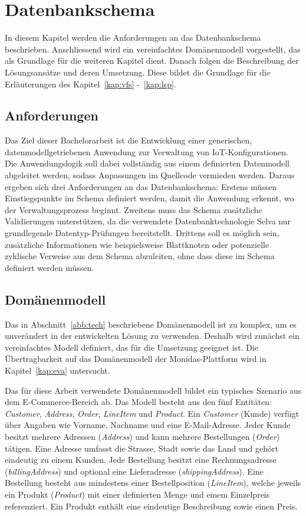\section{Datenbankschema}
\label{kap:dbschema}
In diesem Kapitel werden die Anforderungen an das Datenbankschema beschrieben. Anschliessend wird ein vereinfachtes Domänenmodell vorgestellt, das als Grundlage für die weiteren Kapitel dient. Danach folgen die Beschreibung der Lösungsansätze und deren Umsetzung. Diese bildet die Grundlage für die Erläuterungen des Kapitel~\ref{kap:vfs} -~\ref{kap:lsp}.

\subsection{Anforderungen}
\label{abb:anforderungen}
Das Ziel dieser Bachelorarbeit ist die Entwicklung einer generischen, datenmodellgetriebenen Anwendung zur Verwaltung von IoT-Konfigurationen. Die Anwendungslogik soll dabei vollständig aus einem definierten Datenmodell abgeleitet werden, sodass Anpassungen im Quellcode vermieden werden. Daraus ergeben sich drei Anforderungen an das Datenbankschema: Erstens müssen Einstiegspunkte im Schema definiert werden, damit die Anwendung erkennt, wo der Verwaltungsprozess beginnt. Zweitens muss das Schema zusätzliche Validierungen unterstützen, da die verwendete Datenbanktechnologie Selva nur grundlegende Datentyp-Prüfungen bereitstellt. Drittens soll es möglich sein, zusätzliche Informationen wie beispielsweise Blattknoten oder potenzielle zyklische Verweise aus dem Schema abzuleiten, ohne dass diese im Schema definiert werden müssen.

\subsection{Domänenmodell}
\label{abb:domaenenmodell}
Das in Abschnitt~\ref{abb:tech} beschriebene Domänenmodell ist zu komplex, um es unverändert in der entwickelten Lösung zu verwenden. Deshalb wird zunächst ein vereinfachtes Modell definiert, das für die Umsetzung geeignet ist. Die Übertragbarkeit auf das Domänenmodell der Monidas-Plattform wird in Kapitel~\ref{kap:eva} untersucht.

Das für diese Arbeit verwendete Domänenmodell bildet ein typisches Szenario aus dem E-Commerce-Bereich ab. Das Modell besteht aus den fünf Entitäten: \textit{Customer}, \textit{Address}, \textit{Order}, \textit{LineItem} und \textit{Product}. Ein \textit{Customer} (Kunde) verfügt über Angaben wie Vorname, Nachname und eine E-Mail-Adresse. Jeder Kunde besitzt mehrere Adressen (\textit{Address}) und kann mehrere Bestellungen (\textit{Order}) tätigen. Eine Adresse umfasst die Strasse, Stadt sowie das Land und gehört eindeutig zu einem Kunden. Jede Bestellung besitzt eine Rechnungsadresse (\textit{billingAddress}) und optional eine Lieferadresse (\textit{shippingAddress}). Eine Bestellung besteht aus mindestens einer Bestellposition (\textit{LineItem}), welche jeweils ein Produkt (\textit{Product}) mit einer definierten Menge und einem Einzelpreis referenziert. Ein Produkt enthält eine eindeutige Beschreibung sowie einen Preis.

